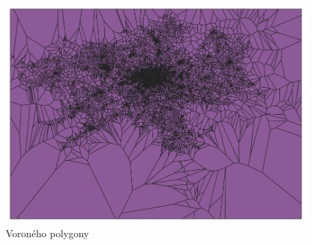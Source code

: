 \begin{figure}[H] \centering
    \includegraphics[width=400pt]{./pictures/voronoi-stops.png}
    \caption[Voroného polygony pro všechny zastávky]{Voroného polygony}
	\label{fig:voronoi-stops}              
\end{figure}
%  
%  
% 
